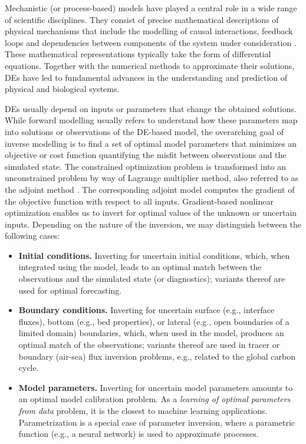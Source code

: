 Mechanistic (or process-based) models have played a central role in a wide range of scientific disciplines. 
They consist of precise mathematical descriptions of physical mechanisms that include the modelling of causal interactions, feedback loops and dependencies between components of the system under consideration \cite{rackauckas2020universal}. 
These mathematical representations typically take the form of differential equations. 
Together with the numerical methods to approximate their solutions, DEs have led to fundamental advances in the understanding and prediction of physical and biological systems.

DEs usually depend on inputs or parameters that change the obtained solutions. 
While forward modelling usually refers to understand how these parameters map into solutions or observations of the DE-based model, 
the overarching goal of inverse modelling is to find a set of optimal model parameters that minimizes an objective or cost function quantifying the misfit between observations and the simulated state.
The constrained optimization problem is transformed into an unconstrained problem by way of Lagrange multiplier method, also referred to as the adjoint method \cite{Vadlamani.2020}. 
The corresponding adjoint model computes the gradient of the objective function with respect to all inputs. 
Gradient-based nonlinear optimization enables us to invert for optimal values of the unknown or uncertain inputs.
Depending on the nature of the inversion, we may distinguish between the following cases:
\begin{itemize}
    \item \textbf{Initial conditions.} Inverting for uncertain initial conditions, which, when integrated using the model, leads to an optimal match between the observations and the simulated state (or diagnostics); variants thereof are used for optimal forecasting.
    \item \textbf{Boundary conditions.} Inverting for uncertain surface (e.g., interface fluxes), bottom (e.g., bed properties), or lateral (e.g., open boundaries of a limited domain) boundaries, which, when used in the model, produces an optimal match of the observations; variants thereof are used in tracer or boundary (air-sea) flux inversion problems, e.g., related to the global carbon cycle.
    \item \textbf{Model parameters.} Inverting for uncertain model parameters amounts to an optimal model calibration problem. As a \textit{learning of optimal parameters from data} problem, it is the closest to machine learning applications. Parametrization is a special case of parameter inversion, where a parametric function (e.g., a neural network) is used to approximate processes. 
\end{itemize}
